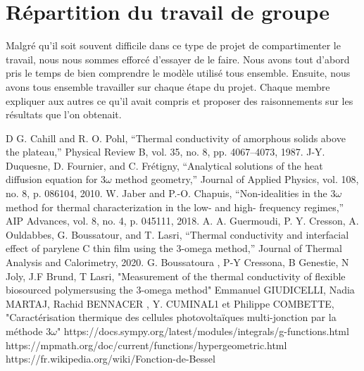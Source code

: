 \documentclass[10pt,a4paper]{report}
\begin{document}
\section{Répartition du travail de groupe}
Malgré qu'il soit souvent difficile dans ce type de projet de compartimenter le travail, nous nous sommes efforcé d'essayer de le faire. Nous avons tout d'abord pris le temps de bien comprendre le modèle utilisé tous ensemble. Ensuite, nous avons tous ensemble travailler sur chaque étape du projet. Chaque membre expliquer aux autres ce qu'il avait compris et proposer des raisonnements sur les résultats que l'on obtenait.
\begin{thebibliography}
D G. Cahill and R. O. Pohl, “Thermal conductivity of amorphous solids above the plateau,” Physical Review B,
vol. 35, no. 8, pp. 4067–4073, 1987.
\newline
\newline
J-Y. Duquesne, D. Fournier, and C. Frétigny, “Analytical solutions of the heat diffusion equation for 3$\omega$ method
geometry,” Journal of Applied Physics, vol. 108, no. 8, p. 086104, 2010.
\newline
\newline
 W. Jaber and P.-O. Chapuis, “Non-idealities in the 3$\omega$ method for thermal characterization in the low- and high-
frequency regimes,” AIP Advances, vol. 8, no. 4, p. 045111, 2018.
\newline
\newline
A. A. Guermoudi, P. Y. Cresson, A. Ouldabbes, G. Boussatour, and T. Lasri, “Thermal conductivity and
interfacial effect of parylene C thin film using the 3-omega method,” Journal of Thermal Analysis and
Calorimetry, 2020.
\newline
\newline
G. Boussatoura , P-Y Cressona, B Genestie, N Joly, J.F Brund, T Lasri, "Measurement of the thermal conductivity of flexible biosourced polymersusing the 3-omega method"
\newline
\newline
Emmanuel GIUDICELLI, Nadia MARTAJ, Rachid BENNACER , Y. CUMINAL1 et Philippe COMBETTE, "Caractérisation thermique des cellules photovoltaïques multi-jonction par la méthode 3$\omega$"
\newline
\newline
https://docs.sympy.org/latest/modules/integrals/g-functions.html
\newline
\newline
https://mpmath.org/doc/current/functions/hypergeometric.html
\newline
\newline
https://fr.wikipedia.org/wiki/Fonction-de-Bessel
\end{thebibliography}
\end{document}
